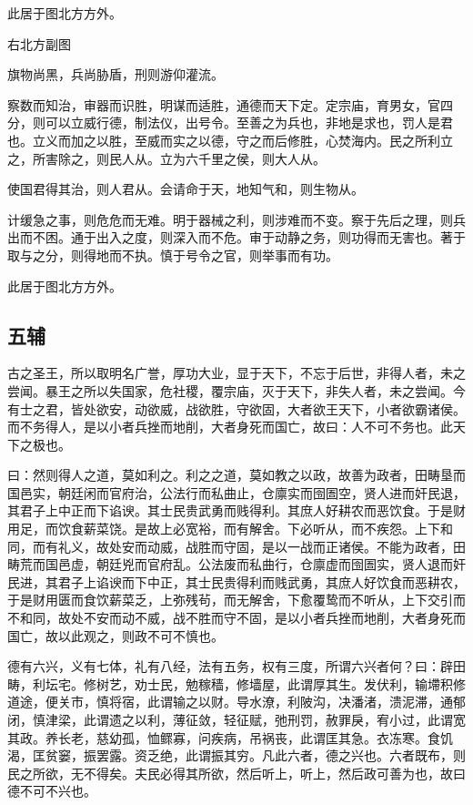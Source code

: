 \documentclass[]{article}
\begin{document}
此居于图北方方外。

右北方副图

旗物尚黑，兵尚胁盾，刑则游仰灌流。

察数而知治，审器而识胜，明谋而适胜，通德而天下定。定宗庙，育男女，官四分，则可以立威行德，制法仪，出号令。至善之为兵也，非地是求也，罚人是君也。立义而加之以胜，至威而实之以德，守之而后修胜，心焚海内。民之所利立之，所害除之，则民人从。立为六千里之侯，则大人从。

使国君得其治，则人君从。会请命于天，地知气和，则生物从。

计缓急之事，则危危而无难。明于器械之利，则涉难而不变。察于先后之理，则兵出而不困。通于出入之度，则深入而不危。审于动静之务，则功得而无害也。著于取与之分，则得地而不执。慎于号令之官，则举事而有功。

此居于图北方方外。

\hypertarget{header-n192}{%
\subsection{五辅 }\label{header-n192}}

古之圣王，所以取明名广誉，厚功大业，显于天下，不忘于后世，非得人者，未之尝闻。暴王之所以失国家，危社稷，覆宗庙，灭于天下，非失人者，未之尝闻。今有士之君，皆处欲安，动欲威，战欲胜，守欲固，大者欲王天下，小者欲霸诸侯。而不务得人，是以小者兵挫而地削，大者身死而国亡，故曰：人不可不务也。此天下之极也。

曰：然则得人之道，莫如利之。利之之道，莫如教之以政，故善为政者，田畴垦而国邑实，朝廷闲而官府治，公法行而私曲止，仓廪实而囹圄空，贤人进而奸民退，其君子上中正而下谄谀。其士民贵武勇而贱得利。其庶人好耕农而恶饮食。于是财用足，而饮食薪菜饶。是故上必宽裕，而有解舍。下必听从，而不疾怨。上下和同，而有礼义，故处安而动威，战胜而守固，是以一战而正诸侯。不能为政者，田畴荒而国邑虚，朝廷兇而官府乱。公法废而私曲行，仓廪虚而囹圄实，贤人退而奸民进，其君子上谄谀而下中正，其士民贵得利而贱武勇，其庶人好饮食而恶耕农，于是财用匮而食饮薪菜乏，上弥残茍，而无解舍，下愈覆鸷而不听从，上下交引而不和同，故处不安而动不威，战不胜而守不固，是以小者兵挫而地削，大者身死而国亡，故以此观之，则政不可不慎也。

德有六兴，义有七体，礼有八经，法有五务，权有三度，所谓六兴者何？曰：辟田畴，利坛宅。修树艺，劝士民，勉稼穑，修墙屋，此谓厚其生。发伏利，输墆积修道途，便关市，慎将宿，此谓输之以财。导水潦，利陂沟，决潘渚，溃泥滞，通郁闭，慎津梁，此谓遗之以利，薄征敛，轻征赋，弛刑罚，赦罪戾，宥小过，此谓宽其政。养长老，慈幼孤，恤鳏寡，问疾病，吊祸丧，此谓匡其急。衣冻寒。食饥渴，匡贫窭，振罢露。资乏绝，此谓振其穷。凡此六者，德之兴也。六者既布，则民之所欲，无不得矣。夫民必得其所欲，然后听上，听上，然后政可善为也，故曰德不可不兴也。
\end{document}
